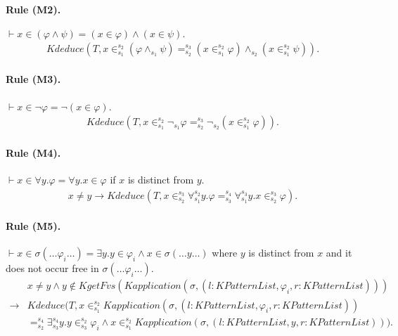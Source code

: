 \documentclass[UTF8]{article}
\theoremstyle{plain}
\theoremstyle{definition}
\theoremstyle{remark}
\newcommand{\cln}{{:}}
\newcommand{\KPatternList}{\mathit{KPatternList}}
\newcommand{\Kapplication}{\mathit{Kapplication}}
\newcommand{\kand}{\wedge}
\newcommand{\knot}{\neg}
\newcommand{\kexists}{\exists}
\newcommand{\kforall}{\forall}
\newcommand{\kequals}{=}
\newcommand{\kin}{\in}
\newcommand{\KgetFvs}{\mathit{KgetFvs}}
\newcommand{\Kdeduce}{\mathit{Kdeduce}}
\begin{document}
\paragraph{Rule (M2).}
$\vdash x \in (\varphi \wedge \psi) = (x \in \varphi) \wedge (x \in \psi).$
\begin{align*}
\Kdeduce(T, x \kin_{s_1}^{s_2} (\varphi \kand_{s_1} \psi) \kequals_{s_2}^{s_3} 
(x 
\kin_{s_1}^{s_2} \varphi) \kand_{s_2} (x \kin_{s_1}^{s_2} \psi)).
\end{align*}

\paragraph{Rule (M3).}
$\vdash x \in \neg \varphi = \neg (x \in \varphi)$.
\begin{align*}
\Kdeduce(T, x \kin_{s_1}^{s_2} \knot_{s_1} \varphi \kequals_{s_2}^{s_3} 
\knot_{s_2} 
(x 
\kin_{s_1}^{s_2} \varphi)).
\end{align*}

\paragraph{Rule (M4).}
$\vdash x \in \forall y . \varphi = \forall y . x \in \varphi$ if $x$ is distinct from $y$.
\begin{align*}
x \neq y \to \Kdeduce(T, x \kin_{s_2}^{s_3} \kforall_{s_1}^{s_2} y . \varphi 
\kequals_{s_3}^{s_4} \kforall_{s_1}^{s_3} y . x \kin_{s_2}^{s_3} \varphi).
\end{align*}

\paragraph{Rule (M5).}
$\vdash x \in \sigma(\dots \varphi_i \dots) = \exists y . y \in \varphi_i \wedge x \in \sigma(\dots y \dots)$ where $y$ is distinct from $x$ and it does not occur free in $\sigma(\dots \varphi_i \dots)$.
\begin{align*}
&x \neq y \wedge y \not\in \KgetFvs(\Kapplication(\sigma, (l\cln\KPatternList, \varphi_i, r\cln\KPatternList)))
\\
\to&\Kdeduce(T, x \kin_{s_1}^{s_2} \Kapplication(\sigma, (l\cln\KPatternList, 
\varphi_i, r\cln\KPatternList))
\\
&\kequals_{s_2}^{s_4} \kexists_{s_3}^{s_4} y . y \kin_{s_3}^{s_2} \varphi_i 
\kand x 
\kin_{s_1}^{s_2} 
\Kapplication(\sigma, (l\cln\KPatternList, y, r\cln\KPatternList))).
\end{align*}
\end{document}
